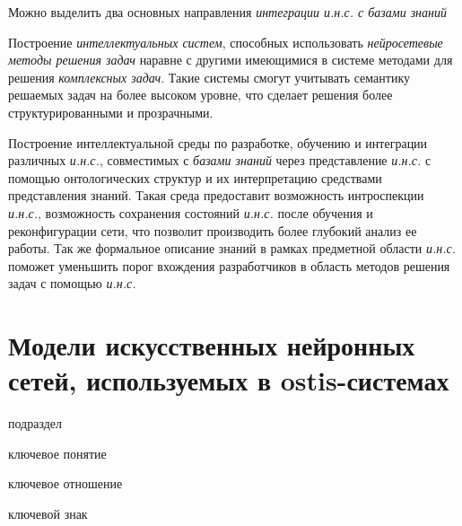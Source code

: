 Можно выделить два основных направления \textit{интеграции и.н.с. с базами знаний} \:
\begin{textitemize}
	\item Построение \textit{интеллектуальных систем}, способных использовать \textit{нейросетевые методы решения задач} наравне с другими имеющимися в системе методами для решения \textit{комплексных задач}. Такие системы смогут учитывать семантику решаемых задач на более высоком уровне, что сделает решения более структурированными и прозрачными.
	\item Построение интеллектуальной среды по разработке, обучению и интеграции различных \textit{и.н.с.}, совместимых с \textit{базами знаний} через представление \textit{и.н.с.} с помощью онтологических структур и их интерпретацию средствами представления знаний. Такая среда предоставит возможность интроспекции \textit{и.н.с.}, возможность сохранения состояний \textit{и.н.с.} после обучения и реконфигурации сети, что позволит производить более глубокий анализ ее работы. Так же формальное описание знаний в рамках предметной области \textit{и.н.с.} поможет уменьшить порог вхождения разработчиков в область методов решения задач с помощью \textit{и.н.с.}
\end{textitemize}


\section{Модели искусственных нейронных сетей, используемых в ostis-системах}
\label{sec_chapter_ann_models}

\begin{SCn}
	\begin{scnrelfromlist}{подраздел}
	\end{scnrelfromlist}

	\bigskip

	\begin{scnrelfromlist}{ключевое понятие}
	\end{scnrelfromlist}

	\begin{scnrelfromlist}{ключевое отношение}
	\end{scnrelfromlist}

	\begin{scnrelfromlist}{ключевой знак}
	\end{scnrelfromlist}
\end{SCn}

